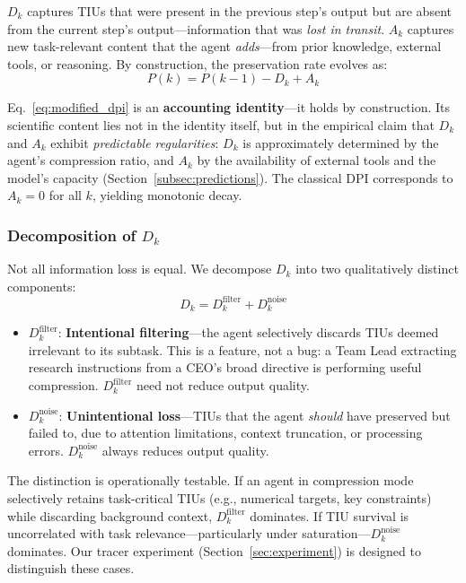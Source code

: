 \documentclass[conference]{IEEEtran}
\begin{document}
$D_k$ captures TIUs that were present in the previous step's output but are absent from the current step's output---information that was \emph{lost in transit}.
$A_k$ captures new task-relevant content that the agent \emph{adds}---from prior knowledge, external tools, or reasoning.
By construction, the preservation rate evolves as:
\begin{equation}
    P(k) = P(k{-}1) - D_k + A_k
    \label{eq:modified_dpi}
\end{equation}

Eq.~\ref{eq:modified_dpi} is an \textbf{accounting identity}---it holds by construction.
Its scientific content lies not in the identity itself, but in the empirical claim that $D_k$ and $A_k$ exhibit \emph{predictable regularities}: $D_k$ is approximately determined by the agent's compression ratio, and $A_k$ by the availability of external tools and the model's capacity (Section~\ref{subsec:predictions}).
The classical DPI corresponds to $A_k = 0$ for all $k$, yielding monotonic decay.

\subsubsection{Decomposition of $D_k$}

Not all information loss is equal.
We decompose $D_k$ into two qualitatively distinct components:
\begin{equation}
    D_k = D_k^{\text{filter}} + D_k^{\text{noise}}
    \label{eq:dk_decompose}
\end{equation}

\begin{itemize}
    \item $D_k^{\text{filter}}$: \textbf{Intentional filtering}---the agent selectively discards TIUs deemed irrelevant to its subtask.
    This is a feature, not a bug: a Team Lead extracting research instructions from a CEO's broad directive is performing useful compression.
    $D_k^{\text{filter}}$ need not reduce output quality.
    \item $D_k^{\text{noise}}$: \textbf{Unintentional loss}---TIUs that the agent \emph{should} have preserved but failed to, due to attention limitations, context truncation, or processing errors.
    $D_k^{\text{noise}}$ always reduces output quality.
\end{itemize}

The distinction is operationally testable.
If an agent in compression mode selectively retains task-critical TIUs (e.g., numerical targets, key constraints) while discarding background context, $D_k^{\text{filter}}$ dominates.
If TIU survival is uncorrelated with task relevance---particularly under saturation---$D_k^{\text{noise}}$ dominates.
Our tracer experiment (Section~\ref{sec:experiment}) is designed to distinguish these cases.
\end{document}

